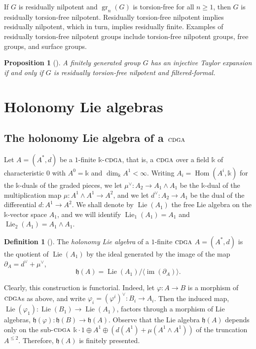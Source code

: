 \documentclass{article}
\numberwithin{equation}{section}
\newtheorem{proposition}[theorem]{Proposition}
\theoremstyle{definition}
\newtheorem{definition}[theorem]{Definition}
\renewcommand{\k}{\mathbb{k}}
\newcommand{\h}{{\mathfrak{h}}}
\newcommand{\cdga}{\ensuremath{\textsc{cdga}}}
\DeclareMathOperator{\gr}{gr}
\DeclareMathOperator{\im}{im}
\DeclareMathOperator{\Hom}{{Hom}}
\DeclareMathOperator{\Lie}{Lie}
\begin{document}
If $G$ is residually nilpotent and $\gr_{n} (G)$ is torsion-free for 
all $n\ge 1$, then $G$ is residually torsion-free nilpotent. 
Residually torsion-free nilpotent implies residually nilpotent, which
in turn, implies residually finite. 
Examples of residually torsion-free nilpotent groups include 
torsion-free nilpotent groups, free groups, and surface groups. 

\begin{proposition}[\cite{SW-ejm}]
\label{prop:fftaylor}
A finitely generated group $G$ has an injective Taylor expansion 
if and only if $G$ is residually torsion-free nilpotent and filtered-formal. 
\end{proposition}

\section{Holonomy Lie algebras}
\label{sect:holo}

\subsection{The holonomy Lie algebra of a $\cdga$}
\label{subsec:holo-dga}

Let $A=(A^{*},d)$  be a $1$-finite $\k$-$\cdga$, that is, a 
$\cdga$ over a field $\k$ of characteristic $0$ with $A^0=\k$ 
and $\dim_{\k} A^1<\infty$. Writing $A_i=\Hom (A^i, \k)$ for 
the $\k$-duals of the graded pieces, we let 
$\mu^{\vee} \colon A_2 \to A_1\wedge A_1$ 
be the $\k$-dual of the multiplication map 
$\mu \colon A^1\wedge A^1\to A^2$, and we 
let $d^{\vee} \colon A_2\to A_1$ be the dual 
of the differential $d \colon A^1\to A^2$. We shall denote by 
$\Lie(A_1)$ the free Lie algebra on the $\k$-vector space $A_1$, 
and we will identify $\Lie_1(A_1)=A_1$ and  
$\Lie_2(A_1)=A_1\wedge A_1$.

\begin{definition}[\cite{MPPS}]
\label{def:holo cdga}
The {\em holonomy Lie algebra}\/ of a $1$-finite $\cdga$ $A=(A^{*},d)$ 
is the quotient of $\Lie(A_1)$ by the ideal generated by the image of the map 
$\partial_A=d^{\vee} + \mu^{\vee}$,
\begin{equation}
\label{eq:holo}
\h(A) = \Lie(A_1) / \langle\im (\partial_A)\rangle. 
\end{equation}
\end{definition}

Clearly, this construction is functorial.  Indeed, let $\varphi\colon A\to B$ is a 
morphism of $\cdga$s as above, and write 
$\varphi_i=(\varphi^i)^{\vee}\colon B_i\to A_i$. 
Then the induced map,  
$\Lie(\varphi_1)\colon \Lie(B_1)\to \Lie(A_1)$, factors through a 
morphism of Lie algebras, $\h(\varphi)\colon \h(B)\to \h(A)$.  
Observe that the Lie algebra $\h(A)$ depends only on the sub-$\cdga$ 
$\k \cdot 1 \oplus A^1 \oplus (d(A^1)+\mu(A^1\wedge A^1))$
of the truncation $A^{\le 2}$. Therefore, $\h(A)$ is finitely presented. 
\end{document}
